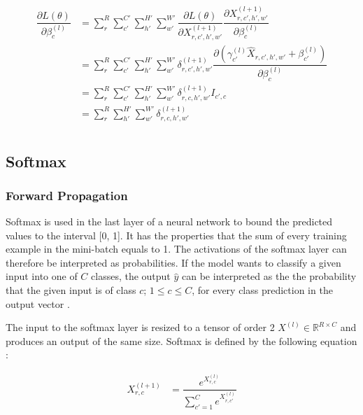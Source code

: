 \documentclass[a4paper, twoside]{article}
\newcommand*{\pd}[2]{\ensuremath{\dfrac{\partial #1}{\partial #2}}}
\begin{document}
\begin{align}
\begin{split}
	\pd{L(\theta)}{\beta^{(l)}_{c}}
		& = \sum^{R }_{r} \sum^{C' }_{c'} \sum^{H' }_{h'} \sum^{W' }_{w'} \pd{L(\theta)}{X^{(l+1)}_{r,c',h',w'}} \pd{X^{(l+1)}_{r,c',h',w'}}{\beta^{(l)}_{c}} \\
		& = \sum^{R }_{r} \sum^{C' }_{c'} \sum^{H' }_{h'} \sum^{W' }_{w'} \delta^{(l+1)}_{r,c',h',w'}  \pd{({\gamma_{c'}^{(l)} \hat{X}_{r,c',h',w'} + \beta_{c'}^{(l)}})}{\beta^{(l)}_{c}} \\
		& = \sum^{R }_{r} \sum^{C' }_{c'} \sum^{H' }_{h'} \sum^{W' }_{w'} \delta^{(l+1)}_{r,c,h',w'} I_{c',c}\\
		& = \sum^{R }_{r} \sum^{H' }_{h'} \sum^{W' }_{w'} \delta^{(l+1)}_{r,c,h',w'} \\
\end{split}
\end{align}

\subsection{Softmax}
\subsubsection{Forward Propagation}
Softmax is used in the last layer of a neural network to bound the predicted values to the interval [0, 1]. It has the properties that the sum of every training example in the mini-batch equals to 1. The activations of the softmax layer can therefore be interpreted as probabilities. If the model wants to classify a given input into one of $C$ classes, the output $\hat{y}$ can be interpreted as the the probability that the given input is of class $c$; $1 \leq c \leq C$, for every class prediction in the output vector \cite{cs231n}.

The input to the softmax layer is resized to a tensor of order 2 $X^{(l)} \in \mathbb{R}^{R \times C}$ and produces an output of the same size. Softmax is defined by the following equation \cite{cs231n}:

\begin{equation}\label{softmax}
\begin{split}
X^{(l+1)}_{r,c}
	& = \dfrac{e^{X^{(l)}_{r,c}}}{\sum^{C }_{c'=1}e^{X^{(l)}_{r,c'}}} \\
\end{split}
\end{equation}
\end{document}
